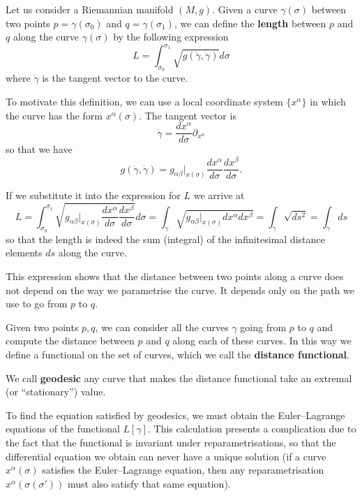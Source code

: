 \begin{points}
\item Let us consider a Riemannian manifold $(M,g)$. Given a curve $\gamma(\sigma)$ between two points $p=\gamma(\sigma_0)$ and $q=\gamma(\sigma_1)$, we can define the \textbf{length} between $p$ and $q$ along the curve $\gamma(\sigma)$ by the following expression
\[
  L=\int_{\sigma_0}^{\sigma_1}\sqrt{g(\dot\gamma,\dot\gamma)}d\sigma
\]
where $\dot\gamma$ is the tangent vector to the curve.

\item To motivate this definition, we can use a local coordinate system $\{x^\alpha\}$ in which the curve has the form $x^\alpha(\sigma)$. The tangent vector is
\[
  \dot\gamma=\frac{dx^\alpha}{d\sigma}\partial_{x^\alpha}
\]
so that we have
\[
  g(\dot\gamma,\dot\gamma)=g_{\alpha\beta}|_{x(\sigma)}\frac{dx^\alpha}{d\sigma}\frac{dx^\beta}{d\sigma} .
\]

\item If we substitute it into the expression for $L$ we arrive at
\[
  L=\int_{\sigma_0}^{\sigma_1}\sqrt{g_{\alpha\beta}|_{x(\sigma)}\frac{dx^\alpha}{d\sigma}\frac{dx^\beta}{d\sigma}}d\sigma=\int_\gamma\sqrt{g_{\alpha\beta}|_{x(\sigma)}dx^\alpha dx^\beta}=\int_\gamma\sqrt{ds^2}=\int_\gamma ds
\]
so that the length is indeed the sum (integral) of the infinitesimal distance elements $ds$ along the curve.

\item This expression shows that the distance between two points along a curve does not depend on the way we parametrise the curve. It depends only on the path we use to go from $p$ to $q$.

\item Given two points $p,q$, we can consider all the curves $\gamma$ going from $p$ to $q$ and compute the distance between $p$ and $q$ along each of these curves. In this way we define a functional on the set of curves, which we call the \textbf{distance functional}.

\item We call \textbf{geodesic} any curve that makes the distance functional take an extremal (or ``stationary'') value.

\item To find the equation satisfied by geodesics, we must obtain the Euler--Lagrange equations of the functional $L[\gamma]$. This calculation presents a complication due to the fact that the functional is invariant under reparametrisations, so that the differential equation we obtain can never have a unique solution (if a curve $x^\alpha(\sigma)$ satisfies the Euler--Lagrange equation, then any reparametrisation $x^\alpha(\sigma(\sigma'))$ must also satisfy that same equation).


\end{points}

